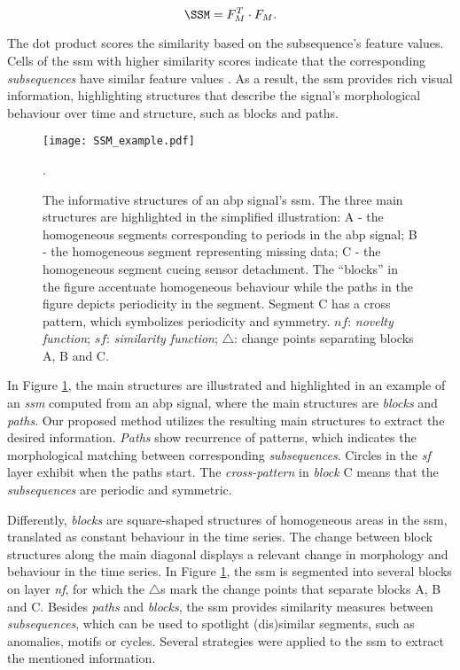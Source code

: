 \begin{equation}
    \SSM = F^T_M \cdot F_M.
\end{equation}

The dot product scores the similarity based on the subsequence's feature values. Cells of the \gls{ssm} with higher similarity scores indicate that the corresponding \textit{subsequences} have similar feature values \cite{audiolabs1, audiolabs2}. As a result, the \gls{ssm} provides rich visual information, highlighting structures that describe the signal's morphological behaviour over time and structure, such as blocks and paths.

\begin{figure}
    \centering
    \texttt{[image: SSM\_example.pdf]}
    \caption{The informative structures of an \gls{abp} signal's \gls{ssm}. The three main structures are highlighted in the simplified illustration: A - the homogeneous segments corresponding to periods in the \gls{abp} signal; B - the homogeneous segment representing missing data; C - the homogeneous segment cueing sensor detachment. The ``blocks'' in the figure accentuate homogeneous behaviour while the paths in the figure depicts periodicity in the segment. Segment C has a cross pattern, which symbolizes periodicity and symmetry. $nf$: \textit{novelty function}; $sf$: \textit{similarity function}; $\triangle$: change points separating blocks A, B and C.}. 
    \label{fig:ssm_description}
\end{figure}

In Figure \ref{fig:ssm_description}, the main structures are illustrated and highlighted in an example of an \textit{\gls{ssm}} \cite{audiolabs1} computed from an \gls{abp} signal, where the main structures are \textit{blocks} and \textit{paths}. Our proposed method utilizes the resulting main structures to extract the desired information.
\textit{Paths} show recurrence of patterns, which indicates the morphological matching between corresponding \textit{subsequences}. Circles in the \textit{sf} layer exhibit when the paths start. The \textit{cross-pattern} in \textit{block} C means that the \textit{subsequences} are periodic and symmetric.

Differently, \textit{blocks} are square-shaped structures of homogeneous areas in the \gls{ssm}, translated as constant behaviour in the time series. The change between block structures along the main diagonal displays a relevant change in morphology and behaviour in the time series. In Figure \ref{fig:ssm_description}, the \gls{ssm} is segmented into several blocks on layer \textit{nf}, for which the $\triangle$s mark the change points that separate blocks A, B and C. Besides \textit{paths} and \textit{blocks}, the \gls{ssm} provides similarity measures between \textit{subsequences}, which can be used to spotlight (dis)similar segments, such as anomalies, motifs or cycles. Several strategies were applied to the \gls{ssm} to extract the mentioned information.


